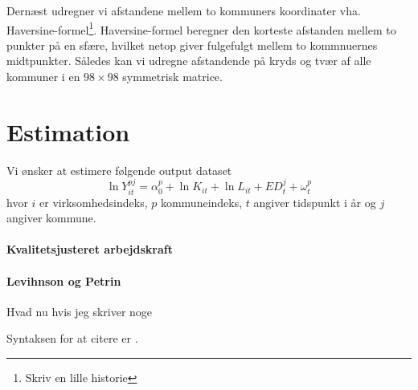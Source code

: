 \documentclass[a4paper, 12pt]{article}
\begin{document}
Dernæst udregner vi afstandene mellem to kommuners koordinater vha. Haversine-formel\footnote{Skriv en lille historie}. Haversine-formel beregner den korteste afstanden mellem to punkter på en sfære, hvilket netop giver fulgefulgt mellem to kommnuernes midtpunkter. Således kan vi udregne afstandende på kryds og tvær af alle kommuner i en $98\times 98$ symmetrisk matrice. 


\section{Estimation}
Vi ønsker at estimere følgende output dataset
\begin{equation}
	\ln Y_{it}^{pj} = \alpha^p_0 + \ln K_{it} + \ln L_{it} + ED^j_{t} + \omega^p_{t}
\end{equation}
hvor $i$ er virksomhedsindeks, $p$ kommuneindeks, $t$ angiver tidspunkt i år og $j$ angiver kommune. 




\paragraph{Kvalitetsjusteret arbejdskraft}



\paragraph{Levihnson og Petrin}
Hvad nu hvis jeg skriver noge

Syntaksen for at citere er \cite[pp. 211ff.]{melo2009meta}. 






\end{document}
